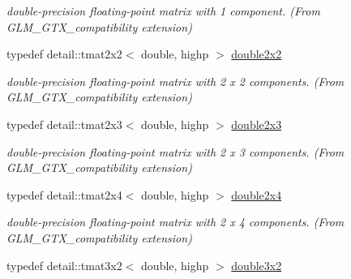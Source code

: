 \begin{CompactItemize}
\begin{CompactList}\small\item\em double-precision floating-point matrix with 1 component. (From GLM\_\-GTX\_\-compatibility extension) \item\end{CompactList}\item 
\hypertarget{group__gtx__compatibility_g75cfac00b48c51f4b677151f789b8547}{
typedef detail::tmat2x2$<$ double, highp $>$ \hyperlink{group__gtx__compatibility_g75cfac00b48c51f4b677151f789b8547}{double2x2}}
\label{group__gtx__compatibility_g75cfac00b48c51f4b677151f789b8547}

\begin{CompactList}\small\item\em double-precision floating-point matrix with 2 x 2 components. (From GLM\_\-GTX\_\-compatibility extension) \item\end{CompactList}\item 
\hypertarget{group__gtx__compatibility_gc267cd849a60e6e96350aa5fd665d5ef}{
typedef detail::tmat2x3$<$ double, highp $>$ \hyperlink{group__gtx__compatibility_gc267cd849a60e6e96350aa5fd665d5ef}{double2x3}}
\label{group__gtx__compatibility_gc267cd849a60e6e96350aa5fd665d5ef}

\begin{CompactList}\small\item\em double-precision floating-point matrix with 2 x 3 components. (From GLM\_\-GTX\_\-compatibility extension) \item\end{CompactList}\item 
\hypertarget{group__gtx__compatibility_g063ad3c07c7650955da6ec55819f11fe}{
typedef detail::tmat2x4$<$ double, highp $>$ \hyperlink{group__gtx__compatibility_g063ad3c07c7650955da6ec55819f11fe}{double2x4}}
\label{group__gtx__compatibility_g063ad3c07c7650955da6ec55819f11fe}

\begin{CompactList}\small\item\em double-precision floating-point matrix with 2 x 4 components. (From GLM\_\-GTX\_\-compatibility extension) \item\end{CompactList}\item 
\hypertarget{group__gtx__compatibility_g1f70107ac850f512ac4e09737e1f85b7}{
typedef detail::tmat3x2$<$ double, highp $>$ \hyperlink{group__gtx__compatibility_g1f70107ac850f512ac4e09737e1f85b7}{double3x2}}
\label{group__gtx__compatibility_g1f70107ac850f512ac4e09737e1f85b7}


\end{CompactItemize}
